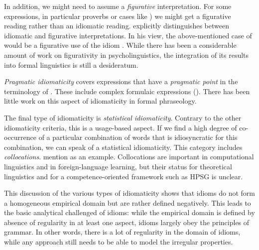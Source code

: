 \documentclass[output=paper]{langsci/langscibook}
\begin{document}
In addition, we might need to assume a \emph{figurative} interpretation. For some expressions, in particular proverbs or cases like 
) we might get a figurative reading rather than an idiomatic reading. 
%
\cite{Glucksberg:01} explicitly distinguishes between idiomatic and figurative interpretations. In his view, the above-mentioned case of  would be a figurative use of the idiom . 
While there has been a considerable amount of work on figurativity in psycholinguistics, the integration of its results into formal linguistics is still a desideratum.




\medskip%
\emph{Pragmatic idiomaticity} covers expressions that have a \emph{pragmatic point} in the terminology of \cite{FKoC88a}. These include complex formulaic expressions (). There has been little work on this aspect of idiomaticity in formal phraseology.

The final type of idiomaticity is \emph{statistical idiomaticity}. 
Contrary to the other idiomaticity criteria, this is a usage-based aspect. If we find a high degree of co-occurrence of a particular combination of words that is idiosyncratic for this combination, we can speak of a statistical idiomaticity. This category includes \emph{collocations}. \cite{Baldwin:Kim:10} mention  as an example. Collocations are important in computational linguistics and in foreign-language learning, but their status for theoretical linguistics and for a competence-oriented framework such as HPSG is unclear. 

\bigskip%
This discussion of the various types of idiomaticity shows that idioms do not form a homogeneous empirical domain but are rather defined negatively. 
This leads to the basic analytical challenged of idioms: while the empirical domain is defined by  absence of regularity in at least one aspect, idioms largely obey the principles of grammar. 
In other words, there is a lot of regularity in the domain of idioms, while any approach still needs to be able to model the irregular properties. 
\end{document}
